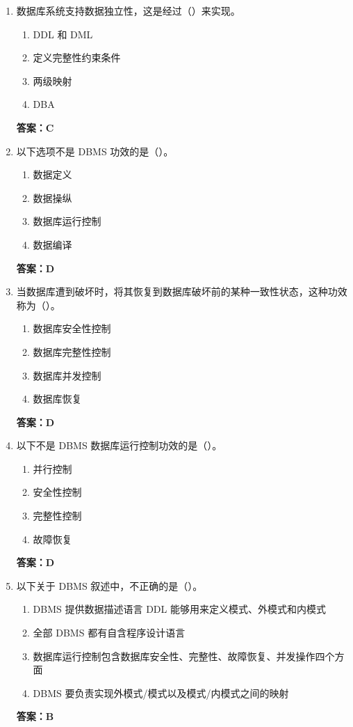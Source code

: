 \documentclass[12pt, a4paper]{article}
\begin{document}
\begin{enumerate}[label=\arabic*.]
	\item 数据库系统支持数据独立性，这是经过（\quad）来实现。
	      \begin{enumerate}
		      \item DDL 和 DML
		      \item 定义完整性约束条件
		      \item 两级映射
		      \item DBA
	      \end{enumerate}
	      \textbf{答案：C}

	\item 以下选项不是 DBMS 功效的是（\quad）。
	      \begin{enumerate}
		      \item 数据定义
		      \item 数据操纵
		      \item 数据库运行控制
		      \item 数据编译
	      \end{enumerate}
	      \textbf{答案：D}

	\item 当数据库遭到破坏时，将其恢复到数据库破坏前的某种一致性状态，这种功效称为（\quad）。
	      \begin{enumerate}
		      \item 数据库安全性控制
		      \item 数据库完整性控制
		      \item 数据库并发控制
		      \item 数据库恢复
	      \end{enumerate}
	      \textbf{答案：D}

	\item 以下不是 DBMS 数据库运行控制功效的是（\quad）。
	      \begin{enumerate}
		      \item 并行控制
		      \item 安全性控制
		      \item 完整性控制
		      \item 故障恢复
	      \end{enumerate}
	      \textbf{答案：D}

	\item 以下关于 DBMS 叙述中，不正确的是（\quad）。
	      \begin{enumerate}
		      \item DBMS 提供数据描述语言 DDL 能够用来定义模式、外模式和内模式
		      \item 全部 DBMS 都有自含程序设计语言
		      \item 数据库运行控制包含数据库安全性、完整性、故障恢复、并发操作四个方面
		      \item DBMS 要负责实现外模式/模式以及模式/内模式之间的映射
	      \end{enumerate}
	      \textbf{答案：B}


\end{enumerate}
\end{document}
